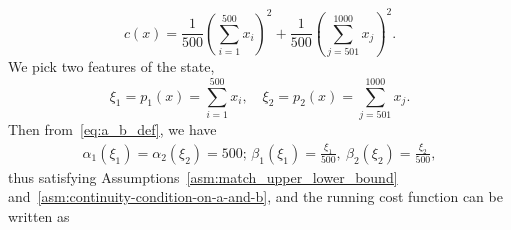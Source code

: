 \documentclass[letterpaper]{article} %
\begin{document}
\begin{equation}
\label{eq:1000d_system_experiment_cost}
    c(x) = 
    \frac{1}{500}(\sum_{i=1}^{500} x_i)^2 + \frac{1}{500}(\sum_{j=501}^{1000}{x_j})^2.
\end{equation}
We pick two features of the state,
\begin{equation}
\label{eq:1000d_features}
    \xi_1 = p_1(x) = \sum_{i=1}^{500} x_i, \quad \xi_2 = p_2(x) = \sum_{j=501}^{1000} x_j.
\end{equation}
Then from~\eqref{eq:a_b_def}, we have
\begin{equation}
\label{eq:1000d_alpha_beta}
\begin{aligned}
    \alpha_1(\xi_1) = \alpha_2(\xi_2) = 500; \, \beta_1(\xi_1) = \frac{\xi_1}{500}, \ \beta_2(\xi_2) = \frac{\xi_2}{500},
\end{aligned}
\end{equation}
thus satisfying Assumptions~\ref{asm:match_upper_lower_bound} and~\ref{asm:continuity-condition-on-a-and-b}, and the running cost function can be written as
\end{document}
